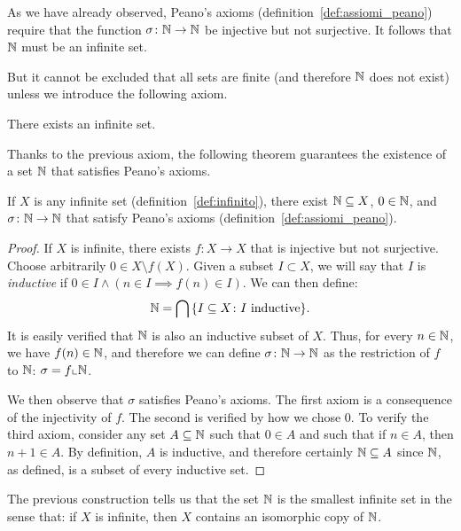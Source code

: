 As we have already observed, Peano's axioms (definition~\ref{def:assiomi_peano})
require that the function $\sigma\colon {\mathbb N}\to{\mathbb N}$ be injective but not
surjective.
It follows that ${\mathbb N}$ must be an infinite set.

But it cannot be excluded that all sets are finite (and therefore ${\mathbb N}$ does not
exist)
unless we introduce the following axiom.

\begin{axiom}[infinity]
  \label{axiom:infinito}%
  There exists an infinite set. 
\end{axiom}

Thanks to the previous axiom, the following theorem guarantees
the existence of a set ${\mathbb N}$ that satisfies Peano's axioms.

\begin{theorem}
  \label{th:esistenza_naturali}%
If $X$ is any infinite set (definition~\ref{def:infinito}),
there exist ${\mathbb N}\subseteq X$, $0\in {\mathbb N}$, and $\sigma\colon {\mathbb N}\to{\mathbb N}$ 
that satisfy Peano's axioms (definition~\ref{def:assiomi_peano}).
\end{theorem}
%
\begin{proof}
If $X$ is infinite, there exists $f\colon X\to X$ that is injective but not
surjective.
Choose arbitrarily $0\in X\setminus f(X)$. 
Given a subset $I\subset X$, we will say that $I$ is \emph{inductive}
%
%
if $0\in I \land (n\in I\implies f(n)\in I)$. 
We can then define:
\[
  {\mathbb N} = \bigcap {\left\{ I\subseteq X\colon \text{$I$ inductive} \right\}}.
\]
It is easily verified that ${\mathbb N}$ is also an inductive subset of $X$.
Thus, for every $n\in {\mathbb N}$, we have $f(n)\in {\mathbb N}$, and therefore we can 
define $\sigma\colon {\mathbb N}\to {\mathbb N}$ as the restriction of $f$ 
to ${\mathbb N}$: $\sigma=f\llcorner {\mathbb N}$.

We then observe that $\sigma$ satisfies Peano's axioms.
The first axiom is a consequence of the injectivity of $f$.
The second is verified by how we chose $0$.
To verify the third axiom, consider any set 
$A\subseteq {\mathbb N}$ such that $0\in A$ and such that if $n\in A$, then $n+1\in A$.
By definition, $A$ is inductive, and therefore certainly 
${\mathbb N}\subseteq A$ since ${\mathbb N}$, as defined,
is a subset of every inductive set.
\end{proof}

The previous construction tells us that the set ${\mathbb N}$ is the smallest infinite
set
in the sense that: if $X$ is infinite, then $X$ contains an isomorphic copy of
${\mathbb N}$.

